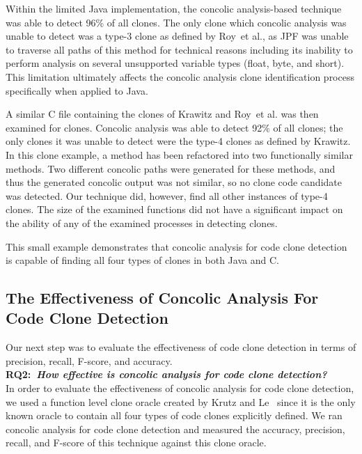 \documentclass{sig-alternate}
\begin{document}
Within the limited Java implementation, the concolic analysis-based technique was able to detect 96\% of all clones. The only clone which concolic analysis was unable to detect was a type-3 clone as defined by Roy~et al., as JPF was unable to traverse all paths of this method for technical reasons including its inability to perform analysis on several unsupported variable types (float, byte, and short). This limitation ultimately affects the concolic analysis clone identification process specifically when applied to Java. 

A similar C file containing the clones of Krawitz and Roy~et al. was then examined for clones. Concolic analysis was able to detect 92\% of all clones; the only clones it was unable to detect were the type-4 clones as defined by Krawitz. In this clone example, a method has been refactored into two functionally similar methods. Two different concolic paths were generated for these methods, and thus the generated concolic output was not similar, so no clone code candidate was detected. Our technique did, however, find all other instances of type-4 clones. The size of the examined functions did not have a significant impact on the ability of any of the examined processes in detecting clones.

This small example demonstrates that concolic analysis for code clone detection is capable of finding all four types of clones in both Java and C. \\




\subsection{The Effectiveness of Concolic Analysis For Code Clone Detection}
\label{sec: acc_prec_rec}

Our next step was to evaluate the effectiveness of code clone detection in terms of precision, recall, F-score, and accuracy. \\

\textbf{RQ2:~\emph{How effective is concolic analysis for code clone detection?}}\\
In order to evaluate the effectiveness of concolic analysis for code clone detection, we used a function level clone oracle created by Krutz and Le~\cite{Krutz:2014:CCO:2597073.2597127} since it is the only known oracle to contain all four types of code clones explicitly defined. We ran concolic analysis for code clone detection and measured the accuracy, precision, recall, and F-score of this technique against this clone oracle.
\end{document}
